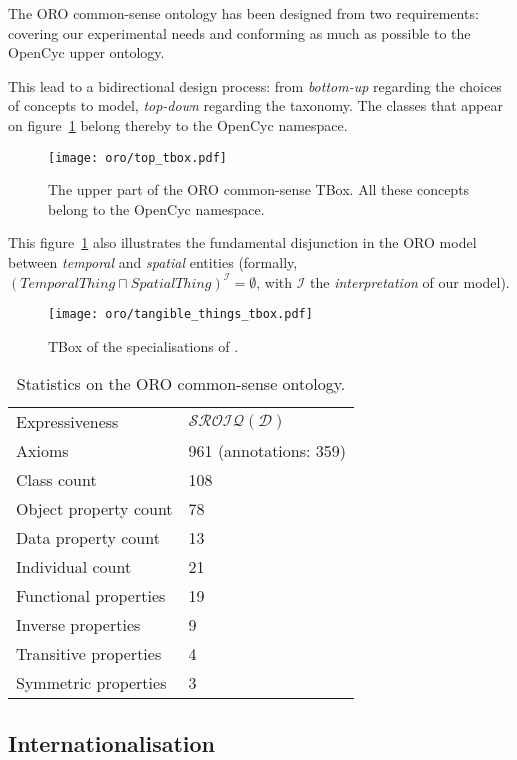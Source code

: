 The ORO common-sense ontology has been designed from two requirements: covering
our experimental needs and conforming as much as possible to the {\sc OpenCyc}
upper ontology.

This lead to a bidirectional design process: from \emph{bottom-up} regarding
the choices of concepts to model, \emph{top-down} regarding the taxonomy. The
classes that appear on figure~\ref{fig|upper_tbox} belong thereby to the {\sc
OpenCyc} namespace.

\begin{figure}
    \centering
    \texttt{[image: oro/top\_tbox.pdf]}

    \caption{The upper part of the ORO common-sense TBox. All these concepts
    belong to the {\sc OpenCyc} namespace.}
    
    \label{fig|upper_tbox}
\end{figure}

This figure~\ref{fig|upper_tbox} also illustrates the fundamental disjunction
in the ORO model between \emph{temporal} and \emph{spatial} entities (formally,
$(TemporalThing \sqcap SpatialThing)^{\mathcal{I}} = \emptyset$, with
$\mathcal{I}$ the \emph{interpretation} of our model).

\begin{figure}
    \centering
    \texttt{[image: oro/tangible\_things\_tbox.pdf]}
    \caption{TBox of the specialisations of .}
    \label{fig|tangible_things_tbox}
\end{figure}


\begin{table}
\begin{center}

\begin{tabular}{ll}
\toprule
Expressiveness & $\mathcal{SROIQ(D)}$ \\
Axioms & 961 (annotations: 359)\\
Class count & 108 \\
Object property count & 78 \\
Data property count & 13 \\
Individual count & 21 \\
Functional properties & 19 \\
Inverse properties & 9 \\
Transitive properties & 4 \\
Symmetric properties & 3 \\
\bottomrule

\end{tabular}
\end{center}

\caption{Statistics on the ORO common-sense ontology.}

\label{table|onto-stats}
\end{table}



\subsection{Internationalisation}
\label{sect|commonsense-i13n}
